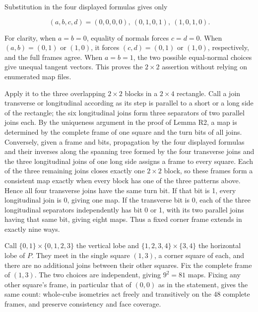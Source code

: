 \documentclass[
  11pt,
]{article}
\begin{document}
Substitution in the four displayed formulas gives only

\[
(a,b,c,d)=(0,0,0,0),\ (0,1,0,1),\ (1,0,1,0).
\]

For clarity, when \(a=b=0\), equality of normals forces \(c=d=0\). When
\((a,b)=(0,1)\) or \((1,0)\), it forces \((c,d)=(0,1)\) or \((1,0)\),
respectively, and the full frames agree. When \(a=b=1\), the two
possible equal-normal choices give unequal tangent vectors. This proves
the \(2\times2\) assertion without relying on enumerated map files.

Apply it to the three overlapping \(2\times2\) blocks in a \(2\times4\)
rectangle. Call a join transverse or longitudinal according as its step
is parallel to a short or a long side of the rectangle; the six
longitudinal joins form three separators of two parallel joins each. By
the uniqueness argument in the proof of Lemma R2, a map is determined by
the complete frame of one square and the turn bits of all joins.
Conversely, given a frame and bits, propagation by the four displayed
formulas and their inverses along the spanning tree formed by the four
transverse joins and the three longitudinal joins of one long side
assigns a frame to every square. Each of the three remaining joins
closes exactly one \(2\times2\) block, so these frames form a consistent
map exactly when every block has one of the three patterns above. Hence
all four transverse joins have the same turn bit. If that bit is 1,
every longitudinal join is 0, giving one map. If the transverse bit is
0, each of the three longitudinal separators independently has bit 0 or
1, with its two parallel joins having that same bit, giving eight maps.
Thus a fixed corner frame extends in exactly nine ways.

Call \(\{0,1\}\times\{0,1,2,3\}\) the vertical lobe and
\(\{1,2,3,4\}\times\{3,4\}\) the horizontal lobe of \(P\). They meet in
the single square \((1,3)\), a corner square of each, and there are no
additional joins between their other squares. Fix the complete frame of
\((1,3)\). The two choices are independent, giving \(9^2=81\) maps.
Fixing any other square's frame, in particular that of \((0,0)\) as in
the statement, gives the same count: whole-cube isometries act freely
and transitively on the 48 complete frames, and preserve consistency and
face coverage.
\end{document}
